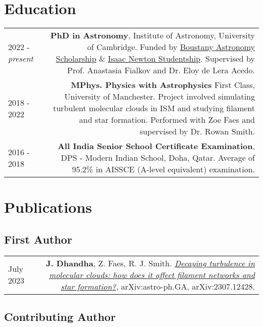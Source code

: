 \documentclass{article}
\begin{document}
\section*{Education}
\begin{tabular}{L!{\vrule}R}
	2022 - \textit{present} & \textbf{PhD in Astronomy}, Institute of Astronomy, University of Cambridge. Funded by \href{https://boustany-foundation.org/scholarship-programmes/astronomy-phd-cambridge/}{Boustany Astronomy Scholarship} \& \href{https://www.cambridgetrust.org/}{Isaac Newton Studentship}. Supervised by Prof. Anastasia Fialkov and Dr. Eloy de Lera Acedo. \\
	2018 - 2022 & \textbf{MPhys. Physics with Astrophysics} First Class, University of Manchester. Project involved simulating turbulent molecular clouds in ISM and studying filament and star formation. Performed with Zoe Faes and supervised by Dr. Rowan Smith. \\
	2016 - 2018 & \textbf{All India Senior School Certificate Examination}, DPS - Modern Indian School, Doha, Qatar. Average of 95.2\% in AISSCE (A-level equivalent) examination.
\end{tabular}

\section*{Publications}

\subsection*{First Author}

\begin{tabular}{L!{\vrule}R}

    July 2023 & \textbf{J. Dhandha}, Z. Faes, R. J. Smith. \href{https://arxiv.org/abs/2307.12428}{\textit{Decaying turbulence in molecular clouds: how does it affect filament networks and star formation?}}, arXiv:astro-ph.GA, arXiv:2307.12428. \\

\end{tabular}

\subsection*{Contributing Author}
\end{document}
